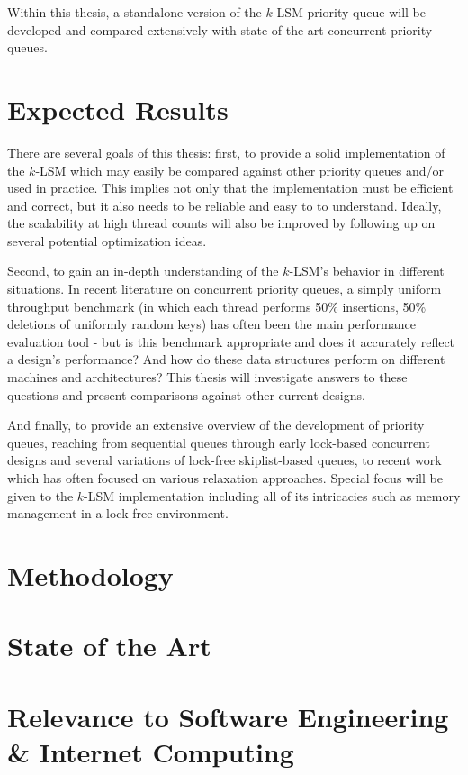 \documentclass[a4paper,10pt]{article}
\begin{document}
Within this thesis, a standalone version of the $k$-LSM priority queue will be developed and
compared extensively with state of the art concurrent priority queues.

\section{Expected Results}

There are several goals of this thesis: first, to provide a solid implementation of the $k$-LSM
which may easily be compared against other priority queues and/or used in practice. This implies not
only that the implementation must be efficient and correct, but it also needs to be reliable and
easy to to understand. Ideally, the scalability at high thread counts will also be improved
by following up on several potential optimization ideas.

Second, to gain an in-depth understanding of the $k$-LSM's behavior in different situations. In
recent literature on concurrent priority queues, a simply uniform throughput benchmark (in which
each thread performs 50\% insertions, 50\% deletions of uniformly random keys) has often
been the main performance evaluation tool - but is this benchmark appropriate and does it accurately
reflect a design's performance? And how do these data structures perform on different machines
and architectures? This thesis will investigate answers to these questions and present comparisons
against other current designs.

And finally, to provide an extensive overview of the development of priority queues, reaching
from sequential queues through early lock-based concurrent designs and several variations of
lock-free skiplist-based queues, to recent work which has often focused on various relaxation
approaches. Special focus will be given to the $k$-LSM implementation including all of its
intricacies such as memory management in a lock-free environment.
\section{Methodology}

\section{State of the Art}

\section{Relevance to Software Engineering \& Internet Computing}

\nocite{*} %
\printbibliography
\end{document}
